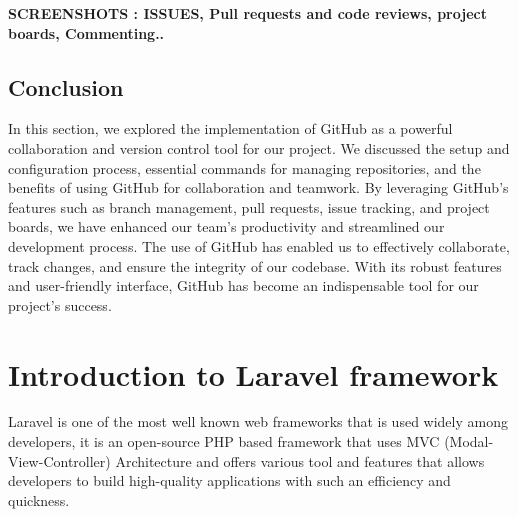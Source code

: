 \medskip \textbf{SCREENSHOTS : ISSUES, Pull requests and code reviews, project boards, Commenting..}
\subsection{Conclusion}
In this section, we explored the implementation of GitHub as a powerful collaboration and version control tool for our project. We discussed the setup and configuration process, essential commands for managing repositories, and the benefits of using GitHub for collaboration and teamwork. By leveraging GitHub's features such as branch management, pull requests, issue tracking, and project boards, we have enhanced our team's productivity and streamlined our development process. The use of GitHub has enabled us to effectively collaborate, track changes, and ensure the integrity of our codebase. With its robust features and user-friendly interface, GitHub has become an indispensable tool for our project's success.
\section{Introduction to Laravel framework}
Laravel is one of the most well known web frameworks that is used widely among developers, it is an open-source PHP based framework that uses MVC (Modal-View-Controller) Architecture and offers various tool and features that allows developers to build high-quality applications with such an efficiency and quickness. 

